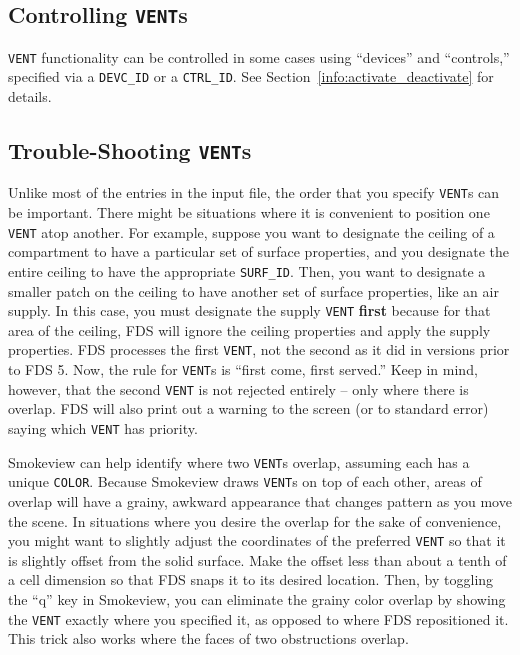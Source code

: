 \documentclass[11pt]{book}
\newcommand{\ct}{\tt\small}
\begin{document}
\subsection{\texorpdfstring{{Controlling {\tt VENT}s}}{Controlling VENTs}}

{\ct VENT} functionality can be controlled in some cases using ``devices'' and ``controls,'' specified via a {\ct DEVC\_ID} or a {\ct CTRL\_ID}.
See Section~\ref{info:activate_deactivate} for details.

\subsection{\texorpdfstring{{Trouble-Shooting {\tt VENT}s}}{Trouble-Shooting VENTs}}
\label{info:VENT_Trouble}

Unlike most of the entries in the input file, the order that you specify {\ct VENT}s can be important. There might be
situations where it is convenient to position one {\ct VENT} atop another. For example, suppose you want to designate the
ceiling of a compartment to have a particular set of surface properties, and you designate the entire ceiling to have the
appropriate {\ct SURF\_ID}. Then, you want to designate a smaller patch on the ceiling to have another set of surface
properties, like an air supply. In this case, you must designate the supply {\ct VENT} {\bf first} because for that area
of the ceiling, FDS will ignore the ceiling properties and apply the supply properties. FDS processes the first {\ct VENT}, not
the second as it did in versions prior to FDS 5. Now, the rule for {\ct VENT}s is ``first come, first served.''
Keep in mind, however, that the
second {\ct VENT} is not rejected entirely -- only where there is overlap. FDS will also print out a warning to the screen (or to
standard error) saying which {\ct VENT} has priority.

Smokeview can help identify where two {\ct VENT}s overlap, assuming each has a unique {\ct COLOR}. Because Smokeview draws {\ct VENT}s
on top of each other, areas of overlap will have a grainy, awkward appearance that changes pattern as you move the scene. In situations
where you desire the overlap for the sake of convenience, you might want to slightly adjust the coordinates of the preferred {\ct VENT}
so that it is slightly offset from the solid surface. Make the offset less than about a tenth of a cell dimension so that FDS snaps it
to its desired location. Then, by toggling the ``q'' key in Smokeview, you can eliminate the grainy color overlap by showing the
{\ct VENT} exactly where you specified it, as opposed to where FDS repositioned it. This trick also works where the faces of two
obstructions overlap.
\end{document}
